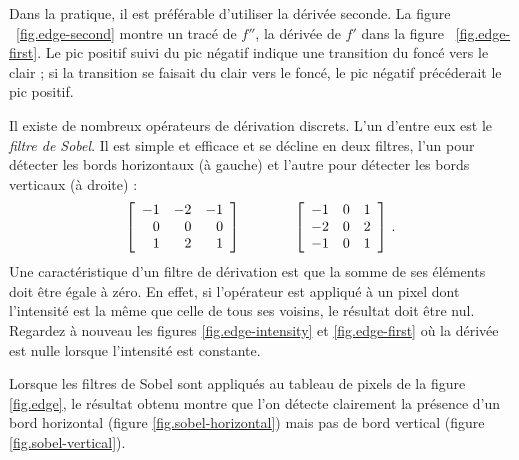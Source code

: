 Dans la pratique, il est préférable d'utiliser la dérivée seconde. La figure ~\ref{fig.edge-second} montre un tracé de $f''$, la dérivée de $f'$ dans la figure ~\ref{fig.edge-first}. Le pic positif suivi du pic négatif indique une transition du foncé vers le clair ; si la transition se faisait du clair vers le foncé, le pic négatif précéderait le pic positif.

Il existe de nombreux opérateurs de dérivation discrets. L'un d'entre eux est le \emph{filtre de Sobel}. Il est simple et efficace et se décline en deux filtres, l'un pour détecter les bords horizontaux (à gauche) et l'autre pour détecter les bords verticaux (à droite) :
\[
\begin{array}{c@{\hspace{4em}}c}
\left[
\begin{array}{rrr}
-1 & -2 & -1\\
0 & 0 & 0\\
1 & 2 & 1\\
\end{array}
\right]
&
\left[
\begin{array}{rrr}
-1 & 0 & 1\\
-2 & 0 & 2\\
-1 & 0 & 1\\
\end{array}
\right]\,.
\end{array}
\]
Une caractéristique d'un filtre de dérivation est que la somme de ses éléments doit être égale à zéro. En effet, si l'opérateur est appliqué à un pixel dont l'intensité est la même que celle de tous ses voisins, le résultat doit être nul. Regardez à nouveau les figures \ref{fig.edge-intensity} et \ref{fig.edge-first} où la dérivée est nulle lorsque l'intensité est constante.

Lorsque les filtres de Sobel sont appliqués au tableau de pixels de la figure \ref{fig.edge}, le résultat obtenu montre que l'on détecte clairement la présence d'un bord horizontal (figure \ref{fig.sobel-horizontal}) mais pas de bord vertical (figure \ref{fig.sobel-vertical}).

